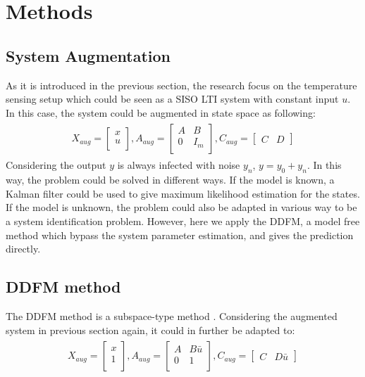 \documentclass[journal]{IEEEtran}
\begin{document}
\section{Methods}
\subsection{System Augmentation}
As it is introduced in the previous section, the research focus on the temperature sensing setup which could be seen as a SISO LTI system with constant input $u$. In this case, the system could be augmented in state space as following:
\begin{align*} 
	\begin{split}
		X_{aug}=
		\begin{bmatrix}
		x\\
		u\\
		\end{bmatrix},
		A_{aug}=
		\begin{bmatrix}
		A & B\\
		0 & I_m\\
		\end{bmatrix}
		,C_{aug}=
		\begin{bmatrix}
		C & D
		\end{bmatrix}
	\end{split}
\end{align*} 
Considering the output $y$ is always infected with noise $y_n$, $y=y_0+y_n$.  
In this way, the problem could be solved in different ways. If the model is known, a Kalman filter could be used to give maximum likelihood estimation for the states. If the model is unknown, the problem could also be adapted in various way to be a system identification problem\cite{sensor-cep}. However, here we apply the DDFM, a model free method which bypass the system parameter estimation, and gives the prediction directly.

\subsection{DDFM method}
The DDFM method is a subspace-type method\cite{sensor-cep} . Considering the augmented system in previous section again, it could in further be adapted to:
\begin{align} 
	\begin{split}
		X_{aug}=
		\begin{bmatrix}
		x\\
		1\\
		\end{bmatrix},
		A_{aug}=
		\begin{bmatrix}
		A & B\bar{u}\\
		0 & 1\\
		\end{bmatrix}
		,C_{aug}=
		\begin{bmatrix}
		C & D\bar{u}
		\end{bmatrix}
	\end{split}
\end{align} 
\end{document}
